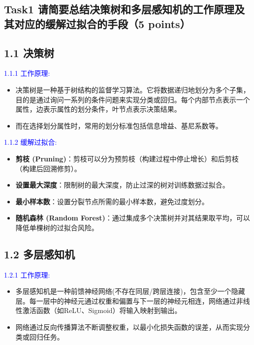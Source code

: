 \documentclass[8pt]{article}
\begin{document}
\subsection*{Task1 请简要总结决策树和多层感知机的工作原理及其对应的缓解过拟合的手段（5 points）} 
\subsection*{1.1 决策树}

\textcolor{blue}{1.1.1 工作原理:}
\begin{itemize}
    \item 决策树是一种基于树结构的监督学习算法。它将数据递归地划分为多个子集，目的是通过询问一系列的条件问题来实现分类或回归。每个内部节点表示一个属性，边表示属性的划分条件，叶节点表示决策结果。
    \item 而在选择划分属性时，常用的划分标准包括信息增益、基尼系数等。
\end{itemize}

\textcolor{blue}{1.1.2 缓解过拟合:}
\begin{itemize}
    \item \textbf{剪枝 (Pruning)}：剪枝可以分为预剪枝（构建过程中停止增长）和后剪枝（构建后回溯修剪）。
    \item \textbf{设置最大深度}：限制树的最大深度，防止过深的树对训练数据过拟合。
    \item \textbf{最小样本数}：设置分裂节点所需的最小样本数，避免过度划分。
    \item \textbf{随机森林 (Random Forest)}：通过集成多个决策树并对其结果取平均，可以降低单棵树的过拟合风险。
\end{itemize}

\subsection*{1.2 多层感知机}

\textcolor{blue}{1.2.1 工作原理:}
\begin{itemize}
    \item 多层感知机是一种前馈神经网络(不存在同层/跨层连接)，包含至少一个隐藏层。每一层中的神经元通过权重和偏置与下一层的神经元相连，网络通过非线性激活函数（如ReLU、Sigmoid）将输入映射到输出。
    \item 网络通过反向传播算法不断调整权重，以最小化损失函数的误差，从而实现分类或回归任务。
\end{itemize}
\end{document}
